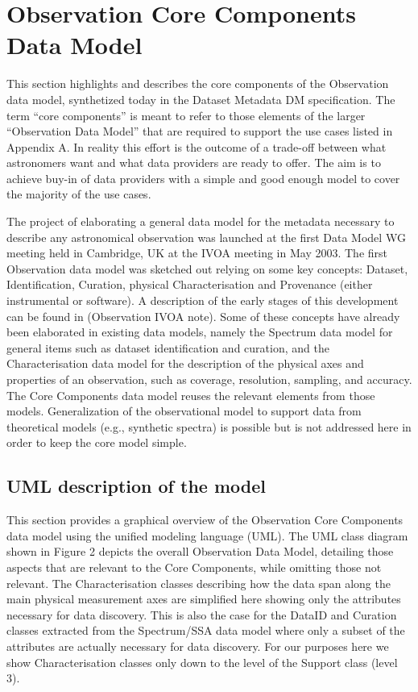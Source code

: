 \documentclass[11pt,a4paper]{ivoa}
\begin{document}
\section[Observation Core Components Data Model]{Observation Core Components Data Model}
\label{sec:core-components}This section highlights and describes the core components of the Observation data model,
synthetized today in the Dataset Metadata DM specification. The term ``core components'' is meant to refer to those
elements of the larger ``Observation Data Model'' that are required to support the use cases listed in Appendix A.  In
reality this effort is the outcome of a trade-off between what astronomers want and what data providers are ready to
offer.  The aim is to achieve buy-in of data providers with a simple and {\textquotedbl}good enough{\textquotedbl}
model to cover the majority of the use cases.

The project of elaborating a general data model for the metadata necessary to describe any astronomical observation was
launched at the first Data Model WG meeting held in Cambridge, UK at the IVOA meeting in May 2003. The first
Observation data model was sketched out relying on some key concepts: Dataset, Identification, Curation, physical
Characterisation and Provenance (either instrumental or software).  A description of the early stages of this
development can be found in \citep{IVOANote:DMObservation} (Observation IVOA note). Some of these concepts have already
been elaborated in existing data models, namely the Spectrum data model \citep{2011ivoa.spec.1120M}  for general items
such as dataset identification and curation, and the Characterisation data model \citep{2008ivoa.spec.0325L} for the
description of the physical axes and properties of an observation, such as coverage, resolution, sampling, and
accuracy.  The Core Components data model reuses the relevant elements from those models.  Generalization of the
observational model to support data from theoretical models (e.g., synthetic spectra) is possible but is not addressed
here in order to keep the core model simple.

\subsection[UML description of the model]{UML description of the model}
\label{sec:uml}
This section provides a graphical overview of the Observation Core Components data model using the unified modeling
language (UML).  The UML class diagram shown in Figure 2 depicts the overall Observation Data Model, detailing those
aspects that are relevant to the Core Components, while omitting those not relevant.  The Characterisation classes
describing how the data span along the main physical measurement axes are simplified here showing only the attributes
necessary for data discovery.  This is also the case for the DataID and Curation classes extracted from the
Spectrum/SSA data model where only a subset of the attributes are actually necessary for data discovery.  For our
purposes here we show Characterisation classes only down to the level of the Support class (level 3).
\end{document}
